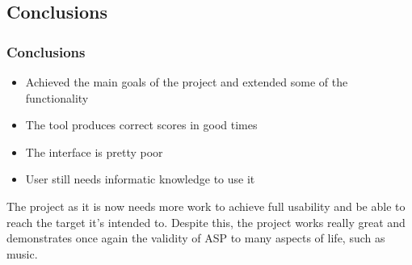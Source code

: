 \documentclass[english]{beamer}
\begin{document}
\subsection{Conclusions}
		\begin{frame}
			\frametitle{Conclusions}
			\begin{itemize}
			      \item<pro@1-> Achieved the main goals of the project and extended some of the functionality
			      \item<pro@1-> The tool produces correct scores in good times
			      \item<con@1-> The interface is pretty poor
			      \item<con@1-> User still needs informatic knowledge to use it
			    \end{itemize}
			 The project as it is now needs more work to achieve full usability and be able to reach the target it's intended to. Despite this, the project works really great and demonstrates once again the validity of ASP to many aspects of life, such as music.
		\end{frame}
\begin{frame}
\titlepage %
\end{frame}
\end{document}
